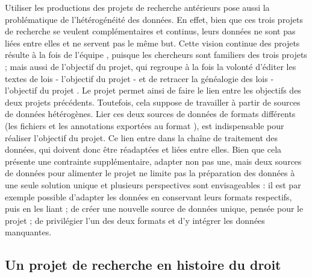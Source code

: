Utiliser les productions des projets de recherche antérieurs pose aussi la problématique de l'hétérogénéité des données. En effet, bien que ces trois projets de recherche se veulent complémentaires et continus, leurs données ne sont pas liées entre elles et ne servent pas le même but. Cette vision continue des projets résulte à la fois de l'équipe \COREL, puisque les chercheurs sont familiers des trois projets ; mais aussi de l'objectif du projet, qui regroupe à la fois la volonté d'éditer les textes de lois - l'objectif du projet \LSC - et de retracer la généalogie des lois - l'objectif du projet \EPJ. Le projet \COREL permet ainsi de faire le lien entre les objectifs des deux projets précédents. Toutefois, cela suppose de travailler à partir de sources de données hétérogènes. Lier ces deux sources de données de formats différents (les fichiers \XML et les annotations exportées au format \JSON), est indispensable pour réaliser l'objectif du projet. Ce lien entre dans la chaîne de traitement des données, qui doivent donc être réadaptées et liées entre elles. Bien que cela présente une contrainte supplémentaire, adapter non pas une, mais deux sources de données pour alimenter le projet ne limite pas la préparation des données à une seule solution unique et plusieurs perspectives sont envisageables : il est par exemple possible d'adapter les données en conservant leurs formats respectifs, puis en les liant ; de créer une nouvelle source de données unique, pensée pour le projet \COREL ; de privilégier l'un des deux formats et d'y intégrer les données manquantes. 

\subsection{Un projet de recherche en histoire du droit}


